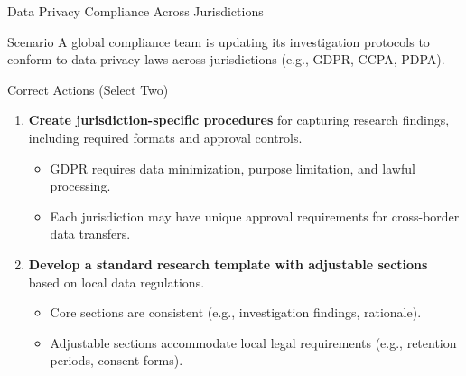 \documentclass{beamer}
\begin{document}
	\begin{frame}{Data Privacy Compliance Across Jurisdictions}
		\begin{block}{Scenario}
			A global compliance team is updating its investigation protocols to conform to data privacy laws across jurisdictions (e.g., GDPR, CCPA, PDPA).
		\end{block}
		\begin{block}{Correct Actions (Select Two)}
			\begin{enumerate}
				\item \textbf{Create jurisdiction-specific procedures} for capturing research findings, including required formats and approval controls.
				\begin{itemize}
					\item GDPR requires data minimization, purpose limitation, and lawful processing.
					\item Each jurisdiction may have unique approval requirements for cross-border data transfers.
				\end{itemize}
				\item \textbf{Develop a standard research template with adjustable sections} based on local data regulations.
				\begin{itemize}
					\item Core sections are consistent (e.g., investigation findings, rationale).
					\item Adjustable sections accommodate local legal requirements (e.g., retention periods, consent forms).
				\end{itemize}
			\end{enumerate}
		\end{block}
	\end{frame}
	
\end{document}
